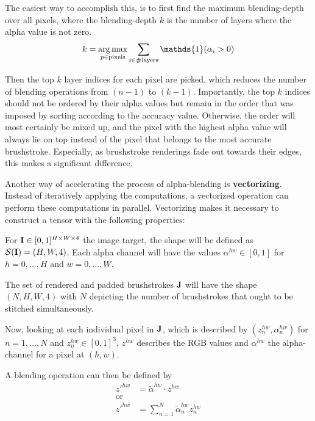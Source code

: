 The easiest way to accomplish this, is to first find the maximum blending-depth over all pixels, where the blending-depth $k$ is the number of layers where the alpha value is not zero.
\begin{align}
    k = \argmax_{p \in \text{pixels}} \sum_{i \in \# \text{layers}} \mathds{1}(\alpha_i > 0)
\end{align}

Then the top $k$ layer indices for each pixel are picked, which reduces the number of blending operations from $(n-1)$ to $(k-1)$.
Importantly, the top $k$ indices should not be ordered by their alpha values but remain in the order that was imposed by sorting according to the accuracy value.
Otherwise, the order will most certainly be mixed up, and the pixel with the highest alpha value will always lie on top instead of the pixel that belongs to the most accurate brushstroke.
Especially, as brushstroke renderings fade out towards their edges, this makes a significant difference.


Another way of accelerating the process of alpha-blending is \textbf{vectorizing}.
Instead of iteratively applying the computations, a vectorized operation can perform these computations in parallel.
Vectorizing makes it necessary to construct a tensor with the following properties:

For $\mathbf{I} \in [0, 1]^{H \times W \times 4} $ the image target, the shape will be defined
as $\mathcal{S}(\mathbf{I}) = (H, W, 4)$.
Each alpha channel will have the values $\alpha^{hw} \in [0, 1]$ for $h = 0, ..., H$ and $w = 0, ..., W$.

The set of rendered and padded brushstrokes $\mathbf{J}$ will have the shape $(N, H, W, 4)$ with $N$ depicting the number of brushstrokes that ought to be stitched simultaneously.

Now, looking at each individual pixel in $\mathbf{J}$, which is described by $(z^{hw}_n, \alpha^{hw}_n)$ for $n = 1, ..., N$ and $z^{hw}_n \in [0, 1]^{3}$, $z^{hw}$ describes the RGB values and $\alpha^{hw}$ the alpha-channel for a pixel at $(h, w)$.

A blending operation can then be defined by
\begin{align}
    z'^{hw} & = \tilde{\alpha}^{hw} \cdot z^{hw} \\
    \text{or} \\
    z'^{hw} & = \sum_{n=1}^N \tilde{\alpha}^{hw}_n  z^{hw}_n \\
\end{align}

